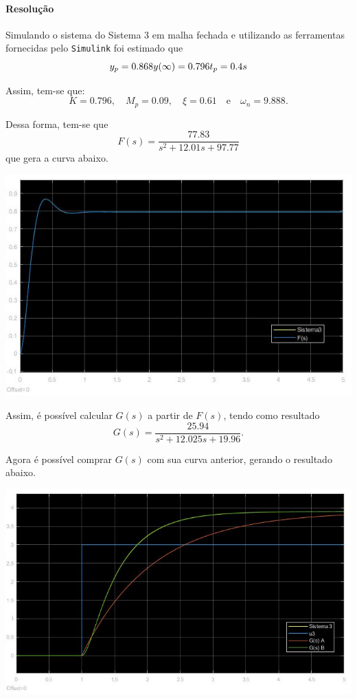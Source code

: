 \documentclass[
]{book}
\theoremstyle{definition}
\theoremstyle{definition}
\theoremstyle{definition}
\theoremstyle{remark}
\begin{document}
\hypertarget{resoluuxe7uxe3o-9}{%
\paragraph{Resolução}\label{resoluuxe7uxe3o-9}}

Simulando o sistema do Sistema 3 em malha fechada e utilizando as ferramentas fornecidas pelo \texttt{Simulink} foi estimado que
\[
y_p = 0.868 \\ 
y(\infty) = 0.796 \\ 
t_p = 0.4s
\]

Assim, tem-se que:
\[
K = 0.796, \quad M_p = 0.09, \quad \xi = 0.61 \quad \text{e} \quad \omega_n= 9.888.
\]

Dessa forma, tem-se que
\[
F(s) = \frac {77.83}{s^2+ 12.01s +97.77}
\]
que gera a curva abaixo.

\includegraphics{Imagens/Lab3/Resolução/prob3BA.jpg}

Assim, é possível calcular \(G(s)\) a partir de \(F(s)\), tendo como resultado
\[
G(s) = \frac {25.94}{s^2+12.025s+19.96}.
\]

Agora é possível comprar \(G(s)\) com sua curva anterior, gerando o resultado abaixo.

\includegraphics{Imagens/Lab3/Resolução/prob3BB.jpg}
\end{document}
